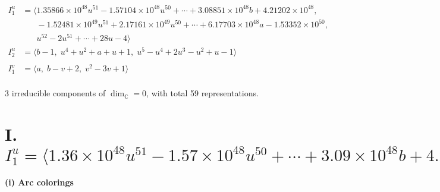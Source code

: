 \documentclass[1p]{elsarticle_modified}
\theoremstyle{definition}
\begin{document}
\begin{align*}
I^u_{1}&=\langle 
1.35866\times10^{48} u^{51}-1.57104\times10^{48} u^{50}+\cdots+3.08851\times10^{48} b+4.21202\times10^{48},\\
\phantom{I^u_{1}}&\phantom{= \langle  }-1.52481\times10^{49} u^{51}+2.17161\times10^{49} u^{50}+\cdots+6.17703\times10^{48} a-1.53352\times10^{50},\\
\phantom{I^u_{1}}&\phantom{= \langle  }u^{52}-2 u^{51}+\cdots+28 u-4\rangle \\
I^u_{2}&=\langle 
b-1,\;u^4+u^2+a+u+1,\;u^5- u^4+2 u^3- u^2+u-1\rangle \\
\\
I^v_{1}&=\langle 
a,\;b- v+2,\;v^2-3 v+1\rangle \\
\end{align*}
\raggedright * 3 irreducible components of $\dim_{\mathbb{C}}=0$, with total 59 representations.\\
\newpage
\renewcommand{\arraystretch}{1}
\centering \section*{I. $I^u_{1}= \langle 1.36\times10^{48} u^{51}-1.57\times10^{48} u^{50}+\cdots+3.09\times10^{48} b+4.21\times10^{48},\;-1.52\times10^{49} u^{51}+2.17\times10^{49} u^{50}+\cdots+6.18\times10^{48} a-1.53\times10^{50},\;u^{52}-2 u^{51}+\cdots+28 u-4 \rangle$}
\flushleft \textbf{(i) Arc colorings}\\
\end{document}
